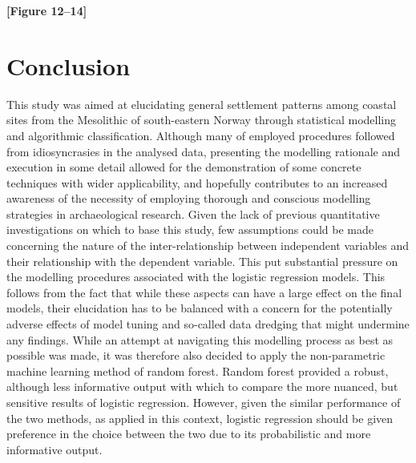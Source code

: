 \documentclass[12pt, a4paper]{article}
\begin{document}
\smallskip
\textbf{[Figure 12--14]}
\smallskip

\section{Conclusion}
This study was aimed at elucidating general settlement patterns among coastal sites from the Mesolithic of south-eastern Norway through statistical modelling and algorithmic classification. Although many of employed procedures followed from idiosyncrasies in the analysed data, presenting the modelling rationale and execution in some detail allowed for the demonstration of some concrete techniques with wider applicability, and hopefully contributes to an increased awareness of the necessity of employing thorough and conscious modelling strategies in archaeological research. Given the lack of previous quantitative investigations on which to base this study, few assumptions could be made concerning the nature of the inter-relationship between independent variables and their relationship with the dependent variable. This put substantial pressure on the modelling procedures associated with the logistic regression models. This follows from the fact that while these aspects can have a large effect on the final models, their elucidation has to be balanced with a concern for the potentially adverse effects of model tuning and so-called data dredging that might undermine any findings. While an attempt at navigating this modelling process as best as possible was made, it was therefore also decided to apply the non-parametric machine learning method of random forest. Random forest provided a robust, although less informative output with which to compare the more nuanced, but sensitive results of logistic regression. However, given the similar performance of the two methods, as applied in this context, logistic regression should be given preference in the choice between the two due to its probabilistic and more informative output.\par 
\end{document}
